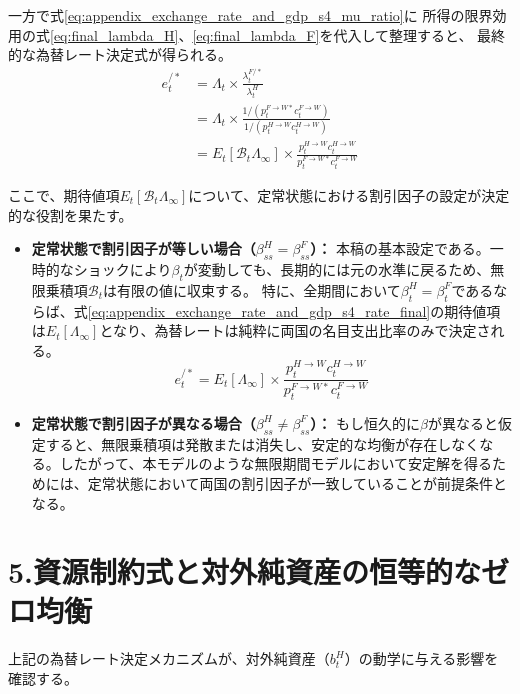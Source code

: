 一方で式\eqref{eq:appendix_exchange_rate_and_gdp_s4_mu_ratio}に
所得の限界効用の式\eqref{eq:final_lambda_H}、\eqref{eq:final_lambda_F}を代入して整理すると、
最終的な為替レート決定式が得られる。
\begin{align}
    e_t^{/*}&=\Lambda_t\times\frac{\lambda_t^{F/*}}{\lambda_t^H} \nonumber \\
    &=\Lambda_t\times\frac{1/(p_t^{F\to W*}c_t^{F\to W})}{1/(p_t^{H\to W}c_t^{H\to W})} \nonumber \\
    &=E_t[\mathcal{B}_t\Lambda_{\infty}]\times\frac{p_t^{H\to W}c_t^{H\to W}}{p_t^{F\to W*}c_t^{F\to W}}
    \label{eq:appendix_exchange_rate_and_gdp_s4_rate_final}
\end{align}

ここで、期待値項\(E_t\left[\mathcal{B}_t\Lambda_{\infty}\right]\)について、定常状態における割引因子の設定が決定的な役割を果たす。

\begin{itemize}
    \item \textbf{定常状態で割引因子が等しい場合（\(\beta_{ss}^H=\beta_{ss}^F\)）：}
    本稿の基本設定である。一時的なショックにより\(\beta_t\)が変動しても、長期的には元の水準に戻るため、無限乗積項\(\mathcal{B}_t\)は有限の値に収束する。
    特に、全期間において\(\beta_t^H=\beta_t^F\)であるならば、式\eqref{eq:appendix_exchange_rate_and_gdp_s4_rate_final}の期待値項は\(E_t[\Lambda_{\infty}]\)となり、為替レートは純粋に両国の名目支出比率のみで決定される。
    \begin{equation}
        e_t^{/*}=E_t[\Lambda_{\infty}]\times\frac{p_t^{H\to W}c_t^{H\to W}}{p_t^{F\to W*}c_t^{F\to W}}
        \label{eq:appendix_exchange_rate_and_gdp_s4_rate_simplified}
    \end{equation}
    
    \item \textbf{定常状態で割引因子が異なる場合（\(\beta_{ss}^H\neq\beta_{ss}^F\)）：}
    もし恒久的に\(\beta\)が異なると仮定すると、無限乗積項は発散または消失し、安定的な均衡が存在しなくなる。したがって、本モデルのような無限期間モデルにおいて安定解を得るためには、定常状態において両国の割引因子が一致していることが前提条件となる。
\end{itemize}

\section*{5.資源制約式と対外純資産の恒等的なゼロ均衡}
\label{sec:appendix_exchange_rate_and_gdp_s5}

上記の為替レート決定メカニズムが、対外純資産（\(b_t^H\)）の動学に与える影響を確認する。

